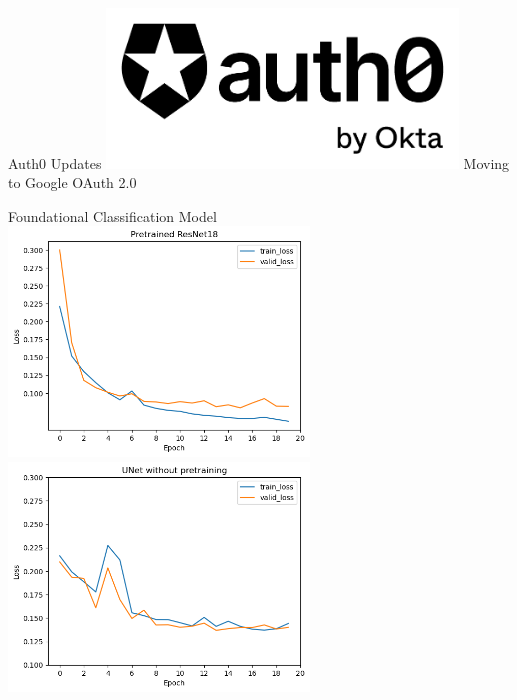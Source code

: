 
\begin{frame}{Auth0 Updates}
    \centering
    \includegraphics[height=0.7\textheight,width=0.7\textwidth,keepaspectratio]{images/mm_auth0.png}
    Moving to Google OAuth 2.0
\end{frame}


\begin{frame}{Foundational Classification Model}
    \centering
    \includegraphics[height=0.6\textheight,width=0.6\textwidth,keepaspectratio]{images/pretrained.png}
    \includegraphics[height=0.6\textheight,width=0.6\textwidth,keepaspectratio]{images/untrained.png}
\end{frame}

